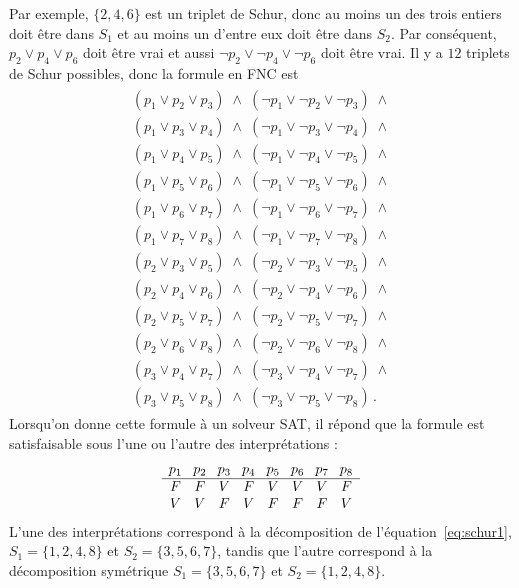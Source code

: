 Par exemple, $\{2,4,6\}$ est un triplet de Schur, donc au moins un des trois entiers doit être dans $S_1$ et au moins un d'entre eux doit être dans $S_2$. Par conséquent, $p_2 \vee p_4 \vee p_6$ doit être vrai et aussi $\neg p_2 \vee \neg p_4 \vee \neg p_6$ doit être vrai. Il y a $12$ triplets de Schur possibles, donc la formule en FNC est 
\begin{align}
\begin{array}{l}
(p_1 \vee p_2 \vee p_3) \;\wedge\; (\neg p_1 \vee \neg p_2 \vee \neg p_3) \;\wedge \\
(p_1 \vee p_3 \vee p_4) \;\wedge\; (\neg p_1 \vee \neg p_3 \vee \neg p_4) \;\wedge \\
(p_1 \vee p_4 \vee p_5) \;\wedge\; (\neg p_1 \vee \neg p_4 \vee \neg p_5) \;\wedge \\
(p_1 \vee p_5 \vee p_6) \;\wedge\; (\neg p_1 \vee \neg p_5 \vee \neg p_6) \;\wedge \\
(p_1 \vee p_6 \vee p_7) \;\wedge\; (\neg p_1 \vee \neg p_6 \vee \neg p_7) \;\wedge \\
(p_1 \vee p_7 \vee p_8) \;\wedge\; (\neg p_1 \vee \neg p_7 \vee \neg p_8) \;\wedge \\
(p_2 \vee p_3 \vee p_5) \;\wedge\; (\neg p_2 \vee \neg p_3 \vee \neg p_5) \;\wedge \\
(p_2 \vee p_4 \vee p_6) \;\wedge\; (\neg p_2 \vee \neg p_4 \vee \neg p_6) \;\wedge \\
(p_2 \vee p_5 \vee p_7) \;\wedge\; (\neg p_2 \vee \neg p_5 \vee \neg p_7) \;\wedge \\
(p_2 \vee p_6 \vee p_8) \;\wedge\; (\neg p_2 \vee \neg p_6 \vee \neg p_8) \;\wedge \\
(p_3 \vee p_4 \vee p_7) \;\wedge\; (\neg p_3 \vee \neg p_4 \vee \neg p_7) \;\wedge \\
(p_3 \vee p_5 \vee p_8) \;\wedge\; (\neg p_3 \vee \neg p_5 \vee \neg p_8)\,.
\end{array}\label{eq.schur2}
\end{align}
Lorsqu'on donne cette formule à un solveur SAT, il répond que la formule est satisfaisable sous l'une ou l'autre des interprétations :
\[
\begin{array}{c@{\hspace{8pt}}c@{\hspace{8pt}}c@{\hspace{8pt}}c@{\hspace{8pt}}c@{\hspace{8pt}}c@{\hspace{8pt}}c@{\hspace{8pt}}c}
p_1&p_2&p_3&p_4&p_5&p_6&p_7&p_8\\\hline
F&F&V&F&V&V&V&F\\
V&V&F&V&F&F&F&V
\end{array}
\]
L'une des interprétations correspond à la décomposition de l'équation~\ref{eq:schur1}, $S_1=\{1,2,4,8\}$ et $S_2=\{3,5,6,7\}$, tandis que l'autre correspond à la décomposition symétrique $S_1=\{3,5,6,7\}$ et $S_2=\{1,2,4,8\}$.



